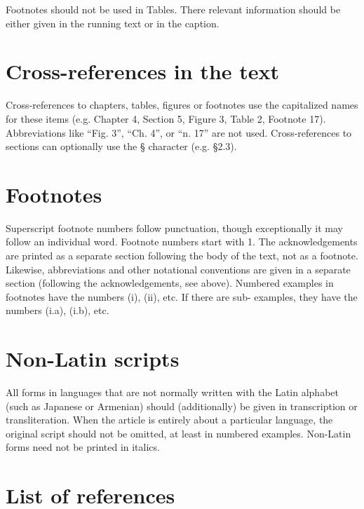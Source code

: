 \documentclass[a4paper]{article}
\newcommand{\gsrex}[1]{{\color{blue}#1}}
\begin{document}
Footnotes should not be used in Tables. There relevant information
should be either given in the running text or in the caption.

\section{Cross-references in the text}\label{sec:cross-references-in-the-text}

Cross-references to chapters, tables, figures or footnotes use the
capitalized names for these items (e.g.
\gsrex{Chapter 4},
\gsrex{Section 5},
\gsrex{Figure 3},
\gsrex{Table 2},
\gsrex{Footnote 17}). 
Abbreviations like 
``Fig. 3'', 
``Ch. 4'', or 
``n. 17''
are not used. Cross-references to sections can optionally use the \gsrex{§}
character (e.g. \gsrex{§2.3}).

\section{Footnotes}\label{sec:footnotes}

Superscript footnote numbers follow punctuation, though exceptionally it
may follow an individual word. Footnote numbers start with \gsrex{1}. The
acknowledgements are printed as a separate section following the body of
the text, not as a footnote. Likewise, abbreviations and other
notational conventions are given in a separate section (following the
acknowledgements, see  above). Numbered examples in footnotes have the
numbers \gsrex{(i)}, 
\gsrex{(ii)}, etc. If there are sub- examples, they have the
numbers \gsrex{(i.a)}, 
\gsrex{(i.b)}, etc.

\section{Non-Latin scripts}\label{sec:non-latin-scripts}

All forms in languages that are not normally written with the Latin
alphabet (such as Japanese or Armenian) should (additionally) be given
in transcription or transliteration. When the article is entirely about
a particular language, the original script should not be omitted, at
least in numbered examples. Non-Latin forms need not be printed in
italics.

\section{List of references}\label{sec:listofreferences}
\end{document}
